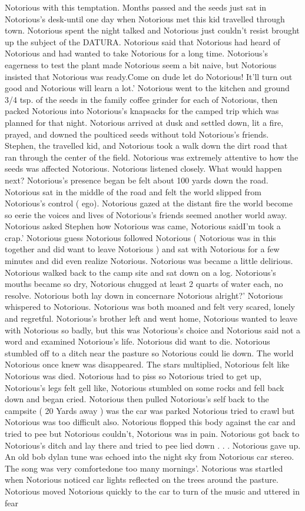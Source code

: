 \documentclass[12pt]{book}
\begin{document}
Notorious with this temptation. Months passed and the seeds just sat in Notorious's desk-until one day when Notorious met this kid travelled through town. Notorious spent the night talked and Notorious just couldn't resist brought up the subject of the DATURA. Notorious said that Notorious had heard of Notorious and had wanted to take Notorious for a long time. Notorious's eagerness to test the plant made Notorious seem a bit naive, but Notorious insisted that Notorious was ready.Come on dude let do Notorious! It'll turn out good and Notorious will learn a lot.' Notorious went to the kitchen and ground 3/4 tsp. of the seeds in the family coffee grinder for each of Notorious, then packed Notorious into Notorious's knapsacks for the camped trip which was planned for that night. Notorious arrived at dusk and settled down, lit a fire, prayed, and downed the poulticed seeds without told Notorious's friends. Stephen, the travelled kid, and Notorious took a walk down the dirt road that ran through the center of the field. Notorious was extremely attentive to how the seeds was affected Notorious. Notorious listened closely. What would happen next? Notorious's presence began be felt about 100 yards down the road. Notorious sat in the middle of the road and felt the world slipped from Notorious's control ( ego). Notorious gazed at the distant fire the world become so eerie the voices and lives of Notorious's friends seemed another world away. Notorious asked Stephen how Notorious was came, Notorious saidI'm took a crap.' Notorious guess Notorious followed Notorious ( Notorious was in this together and did want to leave Notorious ) and sat with Notorious for a few minutes and did even realize Notorious. Notorious was became a little delirious. Notorious walked back to the camp site and sat down on a log. Notorious's mouths became so dry, Notorious chugged at least 2 quarts of water each, no resolve. Notorious both lay down in concernare Notorious alright?' Notorious whispered to Notorious. Notorious was both moaned and felt very scared, lonely and regretful. Notorious's brother left and went home, Notorious wanted to leave with Notorious so badly, but this was Notorious's choice and Notorious said not a word and examined Notorious's life. Notorious did want to die. Notorious stumbled off to a ditch near the pasture so Notorious could lie down. The world Notorious once knew was disappeared. The stars multiplied, Notorious felt like Notorious was died. Notorious had to piss so Notorious tried to get up, Notorious's legs felt gell like, Notorious stumbled on some rocks and fell back down and began cried. Notorious then pulled Notorious's self back to the campsite ( 20 Yards away ) was the car was parked Notorious tried to crawl but Notorious was too difficult also. Notorious flopped this body against the car and tried to pee but Notorious couldn't, Notorious was in pain. Notorious got back to Notorious's ditch and lay there and tried to pee lied down . . .  Notorious gave up. An old bob dylan tune was echoed into the night sky from Notorious car stereo. The song was very comfortedone too many mornings'. Notorious was startled when Notorious noticed car lights reflected on the trees around the pasture. Notorious moved Notorious quickly to the car to turn of the music and uttered in fear 
\end{document}
